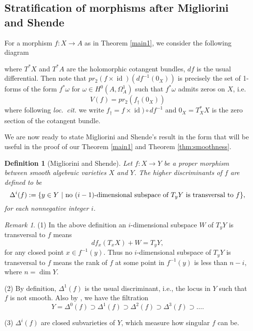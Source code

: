 \documentclass[a4paper,12pt,reqno]{amsart}
\theoremstyle{plain}
\newtheorem{definition}[theorem]{Definition}
\theoremstyle{remark}
\newtheorem{remark}[theorem]{Remark}
\newcommand{\id}{\operatorname{id}}
\newcommand{\pr}{\operatorname{pr}}
\begin{document}




\subsection{Stratification of morphisms after Migliorini and Shende}

For a morphism $f: X\to A$ as in Theorem \ref{main1},  we consider the following diagram 
\begin{center}
\end{center}
 where $T^*X$ and $T^*A$ are the holomorphic cotangent bundles, 
$df$ is the usual differential. Then note
that $pr_2(f\times \id)(df^{-1}(0_X))$ is precisely the 
set of 1-forms of the form $f^*\omega$ for $\omega\in H^0(A, \Omega_A^1)$ such that $f^*\omega$ admits zeros on $X$,
i.e.\
\[V(f) = pr_2(f_{\dagger}(0_X))\]
where following \emph{loc.\ cit.} we write $f_{\dagger} = f\times \id)\circ df^{-1}$ and $0_X = T_X^*X$ is the zero section
of the cotangent bundle. 

We are now ready to state Migliorini and Shende's
result \cite{MiSh} in the form that will be useful in the proof of our Theorem \ref{main1} and Theorem \ref{thm:smoothness}.

\begin{definition}[Migliorini and Shende]
Let $f: X\to Y$ be a proper morphism between smooth algebraic  varieties $X$ and $Y$. The higher discriminants of $f $ are defined to be
$$\Delta^i(f):=\{ y\in Y\ |\ \textnormal{no}\ (i-1)\textnormal{-dimensional subspace of}\  T_yY \ \textnormal{is transversal to} \ f \},$$ for each nonnegative integer $i$.
\end{definition}

\begin{remark}
(1) In the above definition an $i$-dimensional subspace $W$ of $T_yY$ is transversal to $f$ means $$df_x(T_xX)+W=T_yY,$$ for any closed point $x\in f^{-1}(y)$. Thus no $i$-dimensional subspace of $T_yY$ is transversal to $f$ means the rank of $f$ at some point in $f^{-1}(y)$ is less than $n-i$, where $n=\dim Y$.

(2) By definition, $\Delta^1(f)$ is the usual discriminant, i.e., the locus in $Y$ such that $f$ is not smooth. Also by \cite[Proposition 10.6]{Har77}, we have the filtration  $$Y=\Delta^0(f)\supset \Delta^1(f)\supset\Delta^2(f)\supset\Delta^3(f)\supset\ldots.$$

(3) $\Delta^i(f)$ are closed subvarieties of $Y$, which measure how singular $f$ can be.
\end{remark}
\end{document}

